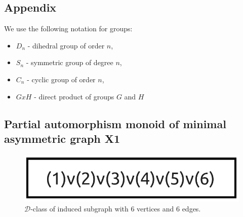 \begin{appendices}
\renewcommand\chaptername{Appendix}
\chapter*{Appendix}
\label{ch:appendix}
\renewcommand{\thesection}{A.\arabic{section}}
\renewcommand{\thefigure}{A.\arabic{figure}}
\setcounter{figure}{0}
\setcounter{section}{0}

We use the following notation for groups:

\begin{itemize}
\item $D_n$ - dihedral group of order $n$,
\item $S_n$ - symmetric group of degree $n$,
\item $C_n$ - cyclic group of order $n$,
\item $G x H$ - direct product of groups $G$ and $H$
\end{itemize}

\section{Partial automorphism monoid of minimal asymmetric graph X1}

\begin{figure}[H]
\includegraphics[scale=0.12]{images/x1/x1_6v_6e.png}
\caption{$\mathcal{D}$-class of induced subgraph with 6 vertices and 6 edges.}
\end{figure}


\end{appendices}
